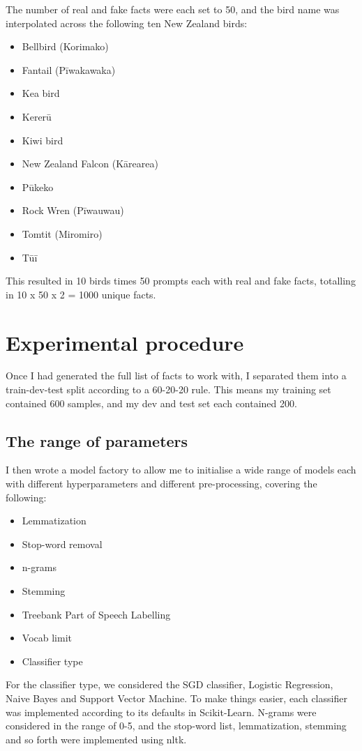 \documentclass[
10pt, %
a4paper, %
oneside, %
headinclude,footinclude, %
BCOR5mm, %
]{scrartcl}
\begin{document}
The number of real and fake facts were each set to 50, and the bird name was interpolated across the following ten New Zealand birds:

\begin{itemize}
\item Bellbird (Korimako)
\item Fantail (Pīwakawaka)
\item Kea bird
\item Kererū
\item Kiwi bird
\item New Zealand Falcon (Kārearea)
\item Pūkeko
\item Rock Wren (Pīwauwau)
\item Tomtit (Miromiro)
\item Tūī
\end{itemize}

This resulted in 10 birds times 50 prompts each with real and fake facts, totalling in 10 x 50 x 2 = 1000 unique facts.

\section{Experimental procedure}

Once I had generated the full list of facts to work with, I separated them into a train-dev-test split according to a 60-20-20 rule. This means my training set contained 600 samples, and my dev and test set each contained 200.

\subsection{The range of parameters}
I then wrote a model factory to allow me to initialise a wide range of models each with different hyperparameters and different pre-processing, covering the following:

\begin{itemize}
\item Lemmatization
\item Stop-word removal
\item n-grams
\item Stemming
\item Treebank Part of Speech Labelling
\item Vocab limit
\item Classifier type
\end{itemize}

For the classifier type, we considered the SGD classifier, Logistic Regression, Naive Bayes and Support Vector Machine. To make things easier, each classifier was implemented according to its defaults in Scikit-Learn. N-grams were considered in the range of 0-5, and the stop-word list, lemmatization, stemming and so forth were implemented using nltk.
\end{document}
